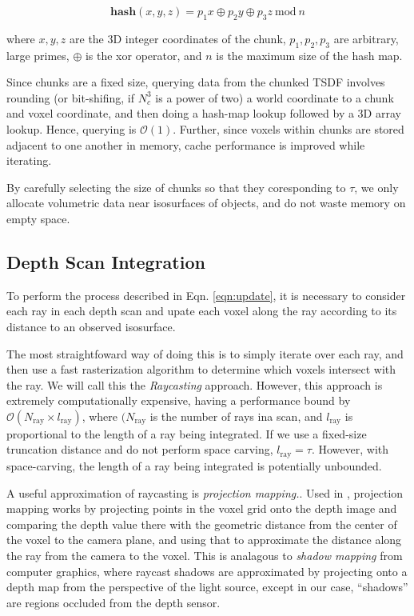 \documentclass[conference,10pt]{IEEEtran}
\begin{document}
$$ \textbf{hash}(x, y, z) = p_1 x\oplus p_2 y \oplus p_3 z ~\text{mod}~n$$

\noindent where $x, y, z$ are the 3D integer coordinates of the chunk, $p_1,
p_2, p_3$ are arbitrary, large primes, $\oplus$ is the xor operator, and $n$ is
the maximum size of the hash map.

Since chunks are a fixed size, querying data from the chunked TSDF involves
rounding (or bit-shifing, if $N_c^3$ is a power of two) a world coordinate to a
chunk and voxel coordinate, and then doing a hash-map lookup followed by a 3D
array lookup. Hence, querying is $\mathcal{O}(1)$. Further, since voxels within
chunks are stored adjacent to one another in memory, cache performance is
improved while iterating.

By carefully selecting the size of chunks so that they coresponding to $\tau$,
we only allocate volumetric data near isosurfaces of objects, and do not waste
memory on empty space.

\subsection{Depth Scan Integration}
\label{section:scan_integration}
To perform the process described in Eqn. \ref{eqn:update}, it is necessary
to consider each ray in each depth scan and upate each voxel
along the ray according to its distance to an observed isosurface.

The most straightfoward way of doing this is to simply iterate over each ray,
and then use a fast rasterization algorithm \cite{RayTracing} to determine which
voxels intersect with the ray. We will call this the \textit{Raycasting}
approach. However, this approach is extremely computationally expensive, having
a performance bound by $\mathcal{O}(N_{\text{ray}} \times
l_{\text{ray}})$, where $(N_{\text{ray}}$ is the number of rays ina 
scan, and $l_{\text{ray}}$  is  proportional to the length of a ray
being integrated. If we use a fixed-size truncation distance and do not perform 
space carving, $l_{\text{ray}} = \tau$. However, with space-carving,
the length of a ray being integrated is potentially unbounded.

A useful approximation of raycasting is \textit{projection mapping.}. Used in
\cite{Nguyen2012, Bylow2013, Klingensmith2014}, projection mapping works by
projecting points in the voxel grid onto the depth image and comparing the depth value
there with the geometric distance from the center of the voxel to the camera
plane, and using that to approximate the distance along the ray from the camera
to the voxel. This is analagous to \textit{shadow mapping} \cite{Shadowmapping}
from computer graphics, where raycast shadows are approximated by projecting
onto a depth map from the perspective of the light source, except in our case, 
``shadows'' are regions occluded from the depth sensor.  
\end{document}
